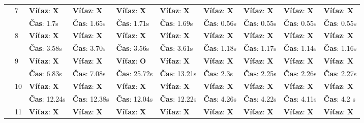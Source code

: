 \begin{table}[H]
\begin{tiny}
\begin{tabular}{|l|l|l|l|l||l|||l|l|l||l|}
            \cline{2-10}
            & \multirow{2}{*}{7}
            & \textbf{Víťaz}: \textbf{X} & \textbf{Víťaz}: \textbf{X} & \textbf{Víťaz}: \textbf{X}& \textbf{Víťaz}: \textbf{X} & \textbf{Víťaz}: \textbf{X} & \textbf{Víťaz}: \textbf{X} & \textbf{Víťaz}: \textbf{X} & \textbf{Víťaz}: \textbf{X} \\
            & & \textbf{Čas}: 1.7s & \textbf{Čas}: 1.65s & \textbf{Čas}: 1.71s &  \textbf{Čas}: 1.69s & \textbf{Čas}: 0.56s & \textbf{Čas}: 0.55s & \textbf{Čas}: 0.55s & \textbf{Čas}: 0.55s \\
            \cline{2-10}
            & \multirow{2}{*}{8}
            & \textbf{Víťaz}: \textbf{X} & \textbf{Víťaz}: \textbf{X} & \textbf{Víťaz}: \textbf{X}& \textbf{Víťaz}: \textbf{X} & \textbf{Víťaz}: \textbf{X} & \textbf{Víťaz}: \textbf{X} & \textbf{Víťaz}: \textbf{X} & \textbf{Víťaz}: \textbf{X} \\
            & & \textbf{Čas}: 3.58s & \textbf{Čas}: 3.70s & \textbf{Čas}: 3.56s &  \textbf{Čas}: 3.61s & \textbf{Čas}: 1.18s & \textbf{Čas}: 1.17s & \textbf{Čas}: 1.14s & \textbf{Čas}: 1.16s \\
            \cline{2-10}
            & \multirow{2}{*}{9}
            & \textbf{Víťaz}: \textbf{X} & \textbf{Víťaz}: \textbf{X} & \textbf{Víťaz}: \textbf{O}& \textbf{Víťaz}: \textbf{X} & \textbf{Víťaz}: \textbf{X} & \textbf{Víťaz}: \textbf{X} & \textbf{Víťaz}: \textbf{X} & \textbf{Víťaz}: \textbf{X} \\
            & & \textbf{Čas}: 6.83s & \textbf{Čas}: 7.08s & \textbf{Čas}: 25.72s &  \textbf{Čas}: 13.21s & \textbf{Čas}: 2.3s & \textbf{Čas}: 2.25s & \textbf{Čas}: 2.26s & \textbf{Čas}: 2.27s \\
            \cline{2-10}
            & \multirow{2}{*}{10}
            & \textbf{Víťaz}: \textbf{X} & \textbf{Víťaz}: \textbf{X} & \textbf{Víťaz}: \textbf{X} & \textbf{Víťaz}: \textbf{X} & \textbf{Víťaz}: \textbf{X} & \textbf{Víťaz}: \textbf{X} & \textbf{Víťaz}: \textbf{X} & \textbf{Víťaz}: \textbf{X} \\
            & & \textbf{Čas}: 12.24s & \textbf{Čas}: 12.38s & \textbf{Čas}: 12.04s &  \textbf{Čas}: 12.22s & \textbf{Čas}: 4.26s & \textbf{Čas}: 4.22s & \textbf{Čas}: 4.11s & \textbf{Čas}: 4.2 s \\
            \cline{2-10}
            & \multirow{2}{*}{11}
            & \textbf{Víťaz}: \textbf{X} & \textbf{Víťaz}: \textbf{X} & \textbf{Víťaz}: \textbf{X} & \textbf{Víťaz}: \textbf{X} & \textbf{Víťaz}: \textbf{X} & \textbf{Víťaz}: \textbf{X} & \textbf{Víťaz}: \textbf{X} & \textbf{Víťaz}: \textbf{X} \\

\end{tabular}
\end{tiny}
\end{table}

